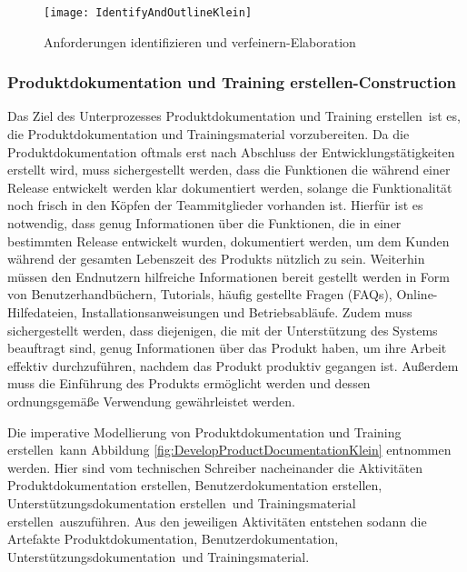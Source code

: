 \begin{figure}[[!htbp]
\begin{center}
  \texttt{[image: IdentifyAndOutlineKlein]} %
  \caption{Anforderungen identifizieren und verfeinern-Elaboration}
  \label{fig:IdentifyAndOutlineKlein}
\end{center}
\end{figure}


\subsubsection{Produktdokumentation und Training erstellen-Construction}
 Das Ziel des Unterprozesses \grqq Produktdokumentation und Training erstellen\grqq \ ist es, die Produktdokumentation und Trainingsmaterial vorzubereiten. Da die Produktdokumentation oftmals erst nach Abschluss der Entwicklungstätigkeiten erstellt wird, muss sichergestellt werden, dass die Funktionen die während einer Release entwickelt werden klar dokumentiert werden, solange die Funktionalität noch frisch in den Köpfen der Teammitglieder vorhanden ist.\newline
 Hierfür ist es notwendig, dass genug Informationen über die Funktionen, die in einer bestimmten Release entwickelt wurden, dokumentiert werden, um dem Kunden während der gesamten Lebenszeit des Produkts nützlich zu sein.\newline
 Weiterhin müssen den Endnutzern hilfreiche Informationen bereit gestellt werden in Form von Benutzerhandbüchern, Tutorials, häufig gestellte Fragen (FAQs), Online-Hilfedateien, Installationsanweisungen und Betriebsabläufe. 
 Zudem muss sichergestellt werden, dass diejenigen, die mit der Unterstützung des Systems beauftragt sind, genug Informationen über das Produkt haben, um ihre Arbeit effektiv durchzuführen, nachdem das Produkt produktiv gegangen ist. Außerdem muss die Einführung des Produkts ermöglicht werden und dessen ordnungsgemäße Verwendung gewährleistet werden.\newline
 
 Die imperative Modellierung von \grqq Produktdokumentation und Training erstellen\grqq \ kann Abbildung \ref{fig:DevelopProductDocumentationKlein} entnommen werden.
 Hier sind vom technischen Schreiber nacheinander die Aktivitäten \grqq Produktdokumentation erstellen\grqq, \grqq Benutzerdokumentation erstellen\grqq, \grqq Unterstützungsdokumentation erstellen\grqq \ und \grqq Trainingsmaterial erstellen\grqq \ auszuführen. Aus den jeweiligen Aktivitäten entstehen sodann die Artefakte \grqq Produktdokumentation, Benutzerdokumentation, Unterstützungsdokumentation\grqq \ und \grqq Trainingsmaterial\grqq.
 
